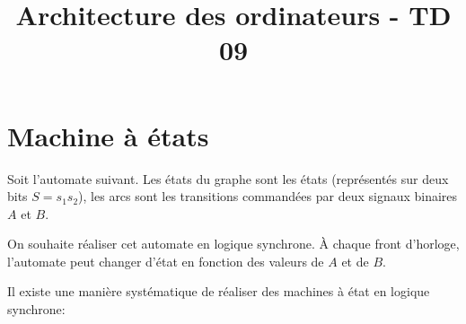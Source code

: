 \documentclass[a4paper,10pt]{exam}
\title{Architecture des ordinateurs - TD 09}
\author{}
\date{}
\begin{document}
\maketitle


\section{Machine à états}

Soit l'automate suivant. Les états du graphe sont les états (représentés sur
deux bits $S = s_1s_2$), les arcs sont les transitions commandées par deux
signaux binaires $A$ et $B$.

\begin{center}
\end{center}

On souhaite réaliser cet automate en logique synchrone. À chaque front
d'horloge, l'automate peut changer d'état en fonction des valeurs de $A$ et
de $B$.

Il existe une manière systématique de réaliser des machines à état en logique
synchrone:
\end{document}
